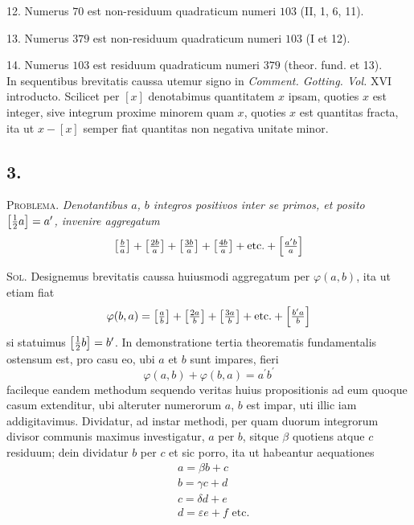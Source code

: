 \documentclass[twoside,12pt]{memoir}
\let\oldfrac\frac
\def\frac#1#2{\mathchoice{\tfrac{#1}{#2}}{\oldfrac{#1}{#2}}{\genfrac{}{}{}{2}{#1}{#2\mathstrut}}{\genfrac{}{}{}{3}{#1}{#2\mathstrut}}}
\begin{document}
12. Numerus \(70\) est non-residuum quadraticum numeri \(103\) (II, 1, 6, 11).
 
13. Numerus \(379\) est non-residuum quadraticum numeri \(103\) (I et 12).
 
14. Numerus \(103\) est residuum quadraticum numeri \(379\) (theor. fund. et 13).\\

In sequentibus brevitatis caussa utemur signo in \textit{Comment. Gotting. Vol.} XVI introducto. Scilicet per \([x]\) denotabimus quantitatem \(x\) ipsam, quoties \(x\) est integer, sive integrum proxime minorem quam \(x\), quoties \(x\) est quantitas fracta, ita ut \(x-[x]\) semper fiat quantitas non negativa unitate minor.

\subsection*{3.}
 
\textsc{Problema.} \textit{Denotantibus \(a\), \(b\) integros positivos inter se primos, et posito \(\left[\frac{1}{2} a\right]=a^{\prime}\), invenire aggregatum}
\[\left[\frac{b}{a}\right]+\left[\frac{2 b}{a}\right]+\left[\frac{3 b}{a}\right]+\left[\frac{4 b}{a}\right]+\text{etc.}+\left[\frac{a^{\prime} b}{a}\right]\]
 
\textsc{Sol.} Designemus brevitatis caussa huiusmodi aggregatum per \(\varphi(a, b)\), ita ut etiam fiat
\[\varphi(b, a)=\left[\frac{a}{b}\right]+\left[\frac{2 a}{b}\right]+\left[\frac{3 a}{b}\right]+\text{etc.}+\left[\frac{b^{\prime} a}{b}\right]\]
si statuimus \(\left[\frac{1}{2} b\right]=b^{\prime}\). In demonstratione tertia theorematis fundamentalis ostensum est, pro casu eo, ubi \(a\) et \(b\) sunt impares, fieri
\[\varphi(a, b)+\varphi(b, a)=a^{\prime} b^{\prime}\]
facileque eandem methodum sequendo veritas huius propositionis ad eum quoque casum extenditur, ubi alteruter numerorum \(a\), \(b\) est impar, uti illic iam addigitavimus. Dividatur, ad instar methodi, per quam duorum integrorum divisor communis maximus investigatur, \(a\) per \(b\), sitque \(\beta\) quotiens atque \(c\) residuum; dein dividatur \(b\) per \(c\) et sic porro, ita ut habeantur aequationes\pagebreak%
\[\begin{aligned}
& a=\beta b+c \\
& b=\gamma c+d \\
& c=\delta d+e \\
& d=\varepsilon e+f \text{ etc.}
\end{aligned}\]
 
\end{document}
